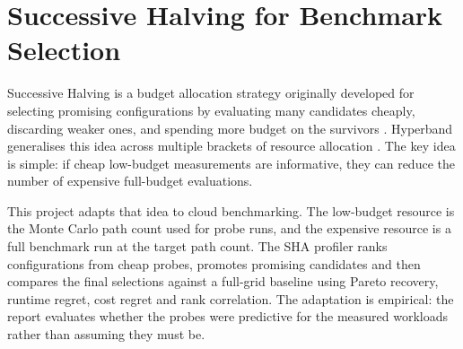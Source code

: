\section{Successive Halving for Benchmark Selection}

Successive Halving is a budget allocation strategy originally developed for selecting promising configurations by evaluating many candidates cheaply, discarding weaker ones, and spending more budget on the survivors \cite{jamieson2016nonstochastic}. Hyperband generalises this idea across multiple brackets of resource allocation \cite{li2016hyperband}. The key idea is simple: if cheap low-budget measurements are informative, they can reduce the number of expensive full-budget evaluations.

This project adapts that idea to cloud benchmarking. The low-budget resource is the Monte Carlo path count used for probe runs, and the expensive resource is a full benchmark run at the target path count. The SHA profiler ranks configurations from cheap probes, promotes promising candidates and then compares the final selections against a full-grid baseline using Pareto recovery, runtime regret, cost regret and rank correlation. The adaptation is empirical: the report evaluates whether the probes were predictive for the measured workloads rather than assuming they must be.

